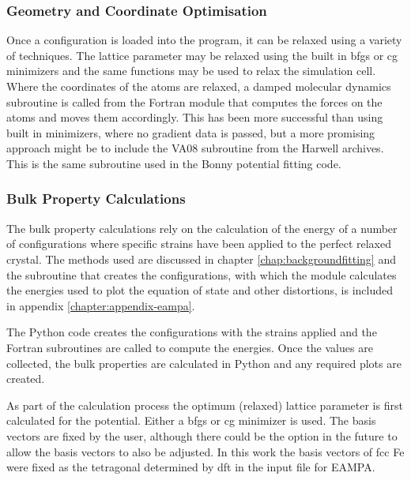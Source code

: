 \subsubsection{Geometry and Coordinate Optimisation}

Once a configuration is loaded into the program, it can be relaxed using a variety of techniques.  The lattice parameter may be relaxed using the built in \acrshort{bfgs} or \acrshort{cg} minimizers and the same functions may be used to relax the simulation cell.  Where the coordinates of the atoms are relaxed, a damped molecular dynamics subroutine is called from the Fortran module that computes the forces on the atoms and moves them accordingly.  This has been more successful than using built in minimizers, where no gradient data is passed, but a more promising approach might be to include the VA08 subroutine from the Harwell archives\cite{harwellva08}.  This is the same subroutine used in the Bonny potential fitting code\cite{bonnyfecr}.



\subsubsection{Bulk Property Calculations}

The bulk property calculations rely on the calculation of the energy of a number of configurations where specific strains have been applied to the perfect relaxed crystal.  The methods used are discussed in chapter \ref{chap:backgroundfitting} and the subroutine that creates the configurations, with which the module calculates the energies used to plot the equation of state and other distortions, is included in appendix \ref{chapter:appendix-eampa}.

The Python code creates the configurations with the strains applied and the Fortran subroutines are called to compute the energies.  Once the values are collected, the bulk properties are calculated in Python and any required plots are created.

As part of the calculation process the optimum (relaxed) lattice parameter is first calculated for the potential.  Either a \acrshort{bfgs} or \acrshort{cg} minimizer is used.  The basis vectors are fixed by the user, although there could be the option in the future to allow the basis vectors to also be adjusted.  In this work the basis vectors of \acrshort{fcc} \Gls{Fe} were fixed as the tetragonal determined by \acrshort{dft} in the input file for EAMPA.  

